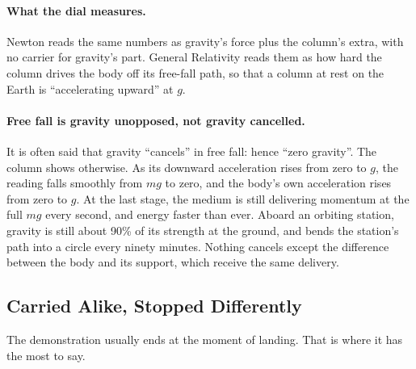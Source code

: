 \paragraph{What the dial measures.}  Newton reads the same numbers as gravity's force plus the column's extra, with no carrier for gravity's part. General Relativity reads them as how hard the column drives the body off its free-fall path, so that a column at rest on the Earth is ``accelerating upward'' at $g$. 

\paragraph{Free fall is gravity unopposed, not gravity cancelled.} It is often said that gravity ``cancels'' in free fall: hence ``zero gravity''. The column shows otherwise. As its downward acceleration rises from zero to $g$, the reading falls smoothly from $mg$ to zero, and the body's own acceleration rises from zero to $g$. At the last stage, the medium is still delivering momentum at the full $mg$ every second, and energy faster than ever. Aboard an orbiting station, gravity is still about 90\% of its strength at the ground, and bends the station's path into a circle every ninety minutes. Nothing cancels except the difference between the body and its support, which receive the same delivery. 

\subsection*{Carried Alike, Stopped Differently}

The demonstration usually ends at the moment of landing. That is where it has the most to say.


